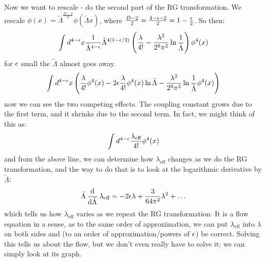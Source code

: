 Now we want to rescale - do the second part of the RG transformation. We rescale $\phi(x) = \tilde{\Lambda}^{\frac{D - 2}{2}}\phi(\tilde{\Lambda} x)$, where $\frac{D - 2}{2} = \frac{4 - \epsilon - 2}{2} = 1 - \frac{\epsilon}{2}$. So then:
\begin{equation}
    \int d^{4-\e}x \frac{1}{\tilde{\Lambda}^{4-\e}} \tilde{\Lambda}^{4(1-\e/2)}\left(\frac{\lambda}{4!} - \frac{\lambda^2}{2^9\pi^2}\ln\frac{1}{\tilde{\Lambda}}\right)\phi^4(x)
\end{equation}
for $\epsilon$ small the $\tilde{\Lambda}$ almost goes away.
\begin{equation}
    \int d^{4-\e}x \left(\frac{\lambda}{4!}\phi^4(x) - 2\e \frac{\lambda}{4!}\phi^4(x)\ln \tilde{\Lambda}  - \frac{\lambda^2}{2^9\pi^2}\ln\frac{1}{\tilde{\Lambda}}\phi^4(x)\right)
\end{equation}
now we can see the two competing effects. The coupling constant grows due to the first term, and it shrinks due to the second term. In fact, we might think of this as:
\begin{equation}
    \int d^{4-\e}\frac{\lambda_{\text{eff}}}{4!}\phi^4(x)
\end{equation}
and from the above line, we can determine how $\lambda_{\text{eff}}$ changes as we do the RG transformation, and the way to do that is to look at the logarithmic derivative by $\tilde{\Lambda}$:
\begin{equation}
    \tilde{\Lambda}\dod{}{\tilde{\Lambda}}\lambda_{\text{eff}} = -2\e\lambda + \frac{3}{64\pi^2}\lambda^2 + \ldots 
\end{equation}
which tells us how $\lambda_{\text{eff}}$ varies as we repeat the RG transformation. It is a flow equation in a sense, as to the same order of approximation, we can put $\lambda_{\text{eff}}$ into $\lambda$ on both sides and (to an order of approximation/powers of $\epsilon$) be correct. Solving this tells us about the flow, but we don't even really have to solve it; we can simply look at its graph.

